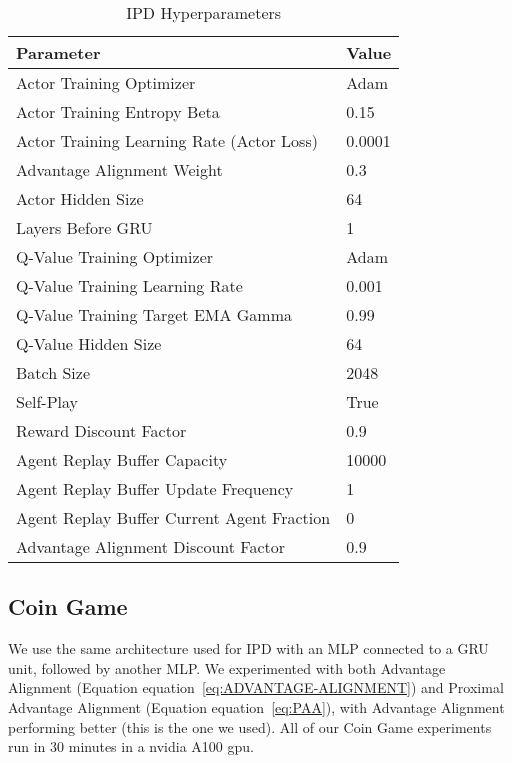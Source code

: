 \documentclass{article} \usepackage{iclr2025_conference,times}
\def\eqref#1{equation~\ref{#1}}
\begin{document}
\begin{table}[h]
\centering
\caption{IPD Hyperparameters}
\label{tab:ipd_config}
\begin{tabular}{ll}
\textbf{Parameter} & \textbf{Value} \\ \hline
Actor Training Optimizer & Adam \\
Actor Training Entropy Beta & 0.15 \\
Actor Training Learning Rate (Actor Loss) & 0.0001 \\
Advantage Alignment Weight & 0.3 \\
Actor Hidden Size & 64 \\
Layers Before GRU & 1 \\
Q-Value Training Optimizer & Adam \\
Q-Value Training Learning Rate & 0.001 \\
Q-Value Training Target EMA Gamma & 0.99 \\
Q-Value Hidden Size & 64 \\
Batch Size & 2048 \\
Self-Play & True \\
Reward Discount Factor & 0.9 \\
Agent Replay Buffer Capacity & 10000 \\
Agent Replay Buffer Update Frequency & 1 \\
Agent Replay Buffer Current Agent Fraction & 0 \\
Advantage Alignment Discount Factor & 0.9 \\
\end{tabular}
\end{table}

\subsection{Coin Game}
\label{app:CG}
We use the same architecture used for IPD with an MLP connected to a GRU unit, followed by another MLP. We experimented with both Advantage Alignment (Equation \eqref{eq:ADVANTAGE-ALIGNMENT}) and Proximal Advantage Alignment (Equation \eqref{eq:PAA}), with Advantage Alignment performing better (this is the one we used). All of our Coin Game experiments run in 30 minutes in a nvidia A100 gpu.
\end{document}

